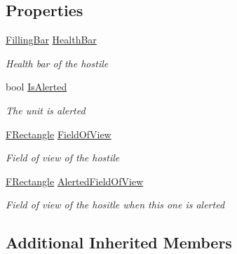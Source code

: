 \subsection*{Properties}
\begin{DoxyCompactItemize}
\item 
\hyperlink{class_hel_project_1_1_u_i_1_1_h_u_d_1_1_filling_bar}{Filling\+Bar} \hyperlink{class_hel_project_1_1_game_world_1_1_entities_1_1_h_hostile_af213001320773aa02dccb5132b4314f8}{Health\+Bar}
\begin{DoxyCompactList}\small\item\em Health bar of the hostile \end{DoxyCompactList}\item 
bool \hyperlink{class_hel_project_1_1_game_world_1_1_entities_1_1_h_hostile_a6342a67533fe79ee3fac54c5006248a9}{Is\+Alerted}
\begin{DoxyCompactList}\small\item\em The unit is alerted \end{DoxyCompactList}\item 
\hyperlink{class_hel_project_1_1_tools_1_1_f_rectangle}{F\+Rectangle} \hyperlink{class_hel_project_1_1_game_world_1_1_entities_1_1_h_hostile_ae9b043f35166b59e96a84778894b12db}{Field\+Of\+View}
\begin{DoxyCompactList}\small\item\em Field of view of the hostile \end{DoxyCompactList}\item 
\hyperlink{class_hel_project_1_1_tools_1_1_f_rectangle}{F\+Rectangle} \hyperlink{class_hel_project_1_1_game_world_1_1_entities_1_1_h_hostile_afbd9573b6ebd47b3accade7d26f99675}{Alerted\+Field\+Of\+View}
\begin{DoxyCompactList}\small\item\em Field of view of the hositle when this one is alerted \end{DoxyCompactList}\end{DoxyCompactItemize}
\subsection*{Additional Inherited Members}


